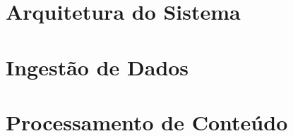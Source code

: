 \documentclass[
	12pt,				%
	openright,			%
	oneside,			%
	a4paper,			%
	english,			%
	french,				%
	spanish,			%
	brazil				%
	]{abntex2}
\begin{document}

\section{Arquitetura do Sistema}\label{sec:arquitetura-do-sistema}

\section{Ingestão de Dados}\label{sec:ingestao-de-dados}

\section{Processamento de Conteúdo}\label{sec:processamento-de-conteudo}
\end{document}
